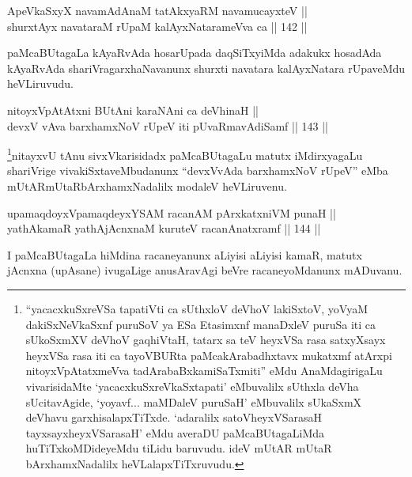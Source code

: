 \begin{shl}
ApeVkaSxyX navamAdAnaM tatAkxyaRM navamucayxteV || \\
shurxtAyx navataraM rUpaM kalAyxNatarameVva ca \hfill || 142 ||  
\end{shl}

\begin{artha}
paMcaBUtagaLa kAyaRvAda hosarUpada daqSiTxyiMda adakukx hosadAda
kAyaRvAda shariVragarxhaNavanunx shurxti navatara kalAyxNatara
rUpaveMdu heVLiruvudu.
\end{artha}


\begin{shl}
nitoyxVpAtAtxni BUtAni karaNAni ca deVhinaH || \\
devxV vAva barxhamxNoV rUpeV iti pUvaRmavAdiSamf \hfill || 143 ||  
\end{shl}

\begin{artha}
\footnote{``yacacxkuSxreVSa tapatiVti ca sUthxloV deVhoV lakiSxtoV, yoV\s yaM dakiSxNeV\s kaSxnf puruSoV ya ESa Etasimxnf manaDxleV puruSa iti ca sUkoSxmXV deVhoV gaqhiVtaH, tatarx sa teV heyxVSa rasa satxyXsayx heyxVSa rasa iti ca tayoVBURta paMcakArabadhxtavx mukatxmf atArxpi nitoyxVpAtatxmeVva tadArabaBxkamiSaTxmiti'' eMdu AnaMdagirigaLu vivarisidaMte `yacacxkuSxreVkaSxtapati' eMbuvalilx sUthxla deVha sUcitavAgide, `yo\s yavf... maMDaleV
puruSaH' eMbuvalilx sUkaSxmX deVhavu garxhisalapxTiTxde. `adaralilx
satoVheyxVSarasaH tayxsayxheyxVSarasaH' eMdu averaDU
paMcaBUtagaLiMda huTiTxkoMDideyeMdu tiLidu baruvudu. ideV mUtAR
mUtaR bArxhamxNadalilx heVLalapxTiTxruvudu.}nitayxvU tAnu sivxVkarisidadx paMcaBUtagaLu matutx iMdirxyagaLu
shariVrige vivakiSxtaveMbudanunx ``devxVvAda barxhamxNoV rUpeV'' eMba
mUtARmUtaRbArxhamxNadalilx modaleV heVLiruvenu.
\end{artha}

\begin{shl}
upamaqdoyxVpamaqdeyxYSAM racanAM pArxkatxniVM punaH || \\
yathAkamaR yathAjAcnxnaM kuruteV racanAnatxramf \hfill || 144 ||  
\end{shl}

\begin{artha}
I paMcaBUtagaLa hiMdina racaneyanunx aLiyisi aLiyisi kamaR, matutx
jAcnxna (upAsane) ivugaLige anusAravAgi beVre racaneyoMdanunx mADuvanu.
\end{artha}

